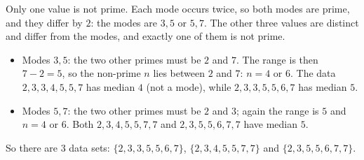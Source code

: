 Only one value is not prime. Each mode occurs twice, so both modes are prime, and they differ by $2$: the modes are $3,5$ or $5,7$. The other three values are distinct and differ from the modes, and exactly one of them is not prime.
\begin{itemize}
\item Modes $3,5$: the two other primes must be $2$ and $7$. The range is then $7-2=5$, so the non-prime $n$ lies between $2$ and $7$: $n=4$ or $6$. The data $2,3,3,4,5,5,7$ has median $4$ (not a mode), while $2,3,3,5,5,6,7$ has median $5$. \checkmark
\item Modes $5,7$: the two other primes must be $2$ and $3$; again the range is $5$ and $n=4$ or $6$. Both $2,3,4,5,5,7,7$ and $2,3,5,5,6,7,7$ have median $5$. \checkmark
\end{itemize}
So there are $\boxed{3}$ data sets: $\{2,3,3,5,5,6,7\}$, $\{2,3,4,5,5,7,7\}$ and $\{2,3,5,5,6,7,7\}$.
